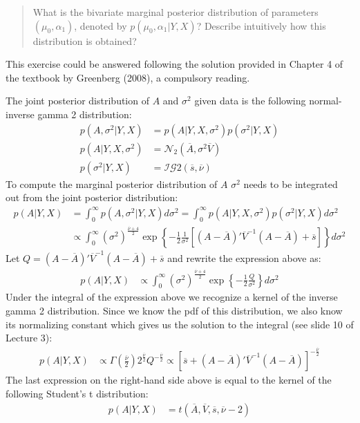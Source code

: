 \documentclass[
  letterpaper,
  DIV=11,
  numbers=noendperiod]{scrreprt}
\begin{document}
\begin{quote}
What is the bivariate marginal posterior distribution of parameters
\((\mu_0,\alpha_1)\), denoted by \(p(\mu_0,\alpha_1|Y,X)\)? Describe
intuitively how this distribution is obtained?
\end{quote}

This exercise could be answered following the solution provided in
Chapter 4 of the textbook by Greenberg (2008), a compulsory reading.

The joint posterior distribution of \(A\) and \(\sigma^2\) given data is
the following normal-inverse gamma 2 distribution: \begin{align*}
p\left(A,\sigma^2|Y,X\right) &= p\left(A|Y,X,\sigma^2\right) p\left(\sigma^2|Y,X\right) \\
p\left(A|Y,X,\sigma^2\right) &= \mathcal{N}_2\left( \overline{A}, \sigma^2 \overline{V} \right)\\
p\left(\sigma^2|Y,X\right) &= \mathcal{IG}2\left( \overline{s}, \overline{\nu} \right)
\end{align*} To compute the marginal posterior distribution of \(A\)
\(\sigma^2\) needs to be integrated out from the joint posterior
distribution: \begin{align*}
p\left(A|Y,X\right) &= \int_0^{\infty}p\left(A,\sigma^2|Y,X\right) d\sigma^2 = \int_0^{\infty}p\left(A|Y,X,\sigma^2\right)p\left(\sigma^2|Y,X\right) d\sigma^2\\
&\propto \int_0^{\infty}
\left(\sigma^2\right)^{\frac{\overline{\nu}+4}{2}}\exp\left\{-\frac{1}{2}\frac{1}{\sigma^2}\left[\left(A-\overline{A}\right)'\overline{V}^{-1}\left(A-\overline{A}\right) + \overline{s}\right]\right\}
 d\sigma^2
\end{align*} Let
\(Q=\left(A-\overline{A}\right)'\overline{V}^{-1}\left(A-\overline{A}\right) + \overline{s}\)
and rewrite the expression above as: \begin{align*}
p\left(A|Y,X\right) &\propto \int_0^{\infty}
\left(\sigma^2\right)^{\frac{\overline{\nu}+4}{2}}\exp\left\{-\frac{1}{2}\frac{Q}{\sigma^2}\right\}
 d\sigma^2
\end{align*} Under the integral of the expression above we recognize a
kernel of the inverse gamma 2 distribution. Since we know the pdf of
this distribution, we also know its normalizing constant which gives us
the solution to the integral (see slide 10 of Lecture 3): \begin{align*}
p\left(A|Y,X\right) &\propto \Gamma\left(\frac{\overline{\nu}}{2}\right)2^{\frac{\overline{\nu}}{2}}Q^{-\frac{\overline{\nu}}{2}} \propto \left[\overline{s}+\left(A-\overline{A}\right)'\overline{V}^{-1}\left(A-\overline{A}\right)\right]^{-\frac{\overline{\nu}}{2}}
\end{align*} The last expression on the right-hand side above is equal
to the kernel of the following Student's t distribution: \begin{align*}
p\left(A|Y,X\right) &= t\left( \overline{A}, \overline{V}, \overline{s}, \overline{\nu}-2 \right)
\end{align*}
\end{document}

